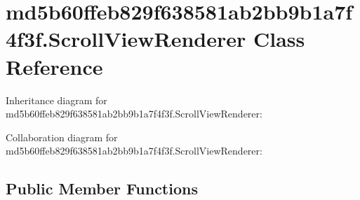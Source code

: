 \hypertarget{classmd5b60ffeb829f638581ab2bb9b1a7f4f3f_1_1_scroll_view_renderer}{}\section{md5b60ffeb829f638581ab2bb9b1a7f4f3f.\+Scroll\+View\+Renderer Class Reference}
\label{classmd5b60ffeb829f638581ab2bb9b1a7f4f3f_1_1_scroll_view_renderer}


Inheritance diagram for md5b60ffeb829f638581ab2bb9b1a7f4f3f.\+Scroll\+View\+Renderer\+:


Collaboration diagram for md5b60ffeb829f638581ab2bb9b1a7f4f3f.\+Scroll\+View\+Renderer\+:
\subsection*{Public Member Functions}

